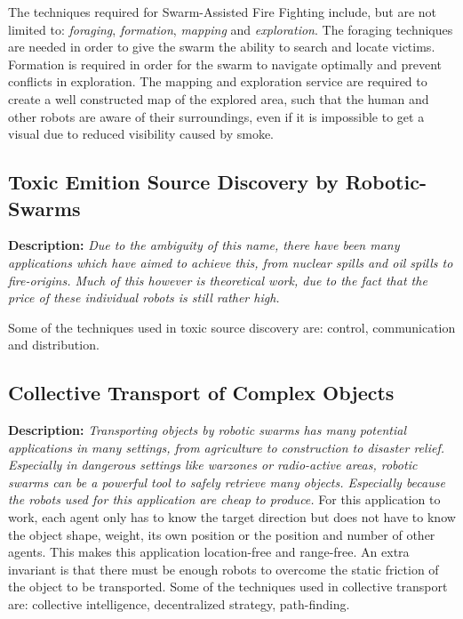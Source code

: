   The techniques required for Swarm-Assisted Fire Fighting include, but are not limited to: \emph{foraging}, \emph{formation}, \emph{mapping} and \emph{exploration}.\cite{Naghsh2008,Penders2011} The foraging techniques are needed in order to give the swarm the ability to search and locate victims. Formation is required in order for the swarm to navigate optimally and prevent conflicts in exploration. The mapping and exploration service are required to create a well constructed map of the explored area, such that the human and other robots are aware of their surroundings, even if it is impossible to get a visual due to reduced visibility caused by smoke.

  \subsection{Toxic Emition Source Discovery by Robotic-Swarms}
  \textbf{Description: }\emph{Due to the ambiguity of this name, there have been many applications which have aimed to achieve this, from nuclear spills and oil spills to fire-origins. Much of this however is theoretical work, due to the fact that the price of these individual robots is still rather high.}

  Some of the techniques used in toxic source discovery are: control, communication and distribution.\cite{Li2012}

 \subsection{Collective Transport of Complex Objects}
 \textbf{Description: } \emph{Transporting objects by robotic swarms has many potential applications in many settings, from agriculture to construction to disaster relief. Especially in dangerous settings like warzones or radio-active areas, robotic swarms can be a powerful tool to safely retrieve many objects. Especially because the robots used for this application are cheap to produce. }
For this application to work, each agent only has to know the target direction but does not have to know the object shape, weight, its own position or the position and number of other agents. This makes this application location-free and range-free. An extra invariant is that there must be enough robots to overcome the static friction of the object to be transported. Some of the techniques used in collective transport are: collective intelligence, decentralized strategy, path-finding. \cite{Rubenstein}

